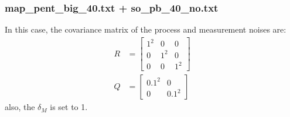\documentclass[11pt,a4paper]{article}
\begin{document}
\subsubsection{map\_pent\_big\_40.txt + so\_pb\_40\_no.txt}
\par In this case, the covariance matrix of the process and measurement noises are:
\begin{align*}
	R &= \begin{bmatrix} 1^{2} & 0 & 0 \\ 0 & 1^{2} & 0 \\ 0 & 0 & 1^{2} \end{bmatrix} \\
	Q &= \begin{bmatrix} 0.1^{2} & 0 \\ 0 & 0.1^{2} \end{bmatrix}
\end{align*}
also, the $\delta_{M}$ is set to 1.
\end{document}
